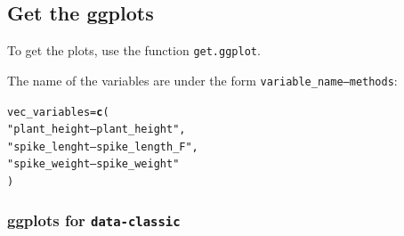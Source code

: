 \documentclass{article}\usepackage[]{graphicx}\usepackage[]{color}
\makeatletter
\newcommand{\hlstr}[1]{\textcolor[rgb]{0.192,0.494,0.8}{#1}}%
\newcommand{\hlstd}[1]{\textcolor[rgb]{0.345,0.345,0.345}{#1}}%
\newcommand{\hlkwb}[1]{\textcolor[rgb]{0.69,0.353,0.396}{#1}}%
\newcommand{\hlkwd}[1]{\textcolor[rgb]{0.737,0.353,0.396}{\textbf{#1}}}%
\newenvironment{kframe}{%
 \def\at@end@of@kframe{}%
 \ifinner\ifhmode%
  \def\at@end@of@kframe{\end{minipage}}%
  \begin{minipage}{\columnwidth}%
 \fi\fi%
 \def\FrameCommand##1{\hskip\@totalleftmargin \hskip-\fboxsep
 \colorbox{shadecolor}{##1}\hskip-\fboxsep
     \hskip-\linewidth \hskip-\@totalleftmargin \hskip\columnwidth}%
 \MakeFramed {\advance\hsize-\width
   \@totalleftmargin\z@ \linewidth\hsize
   \@setminipage}}%
 {\par\unskip\endMakeFramed%
 \at@end@of@kframe}
\newenvironment{knitrout}{}{} %
\makeatother
\begin{document}
\subsection{Get the ggplots}

To get the plots, use the function \texttt{get.ggplot}.

The name of the variables are under the form \texttt{variable\_name---methods}:
\begin{knitrout}
\color{fgcolor}\begin{kframe}
\begin{alltt}
\hlstd{vec_variables} \hlkwb{=} \hlkwd{c}\hlstd{(}
        \hlstr{"plant_height---plant_height"}\hlstd{,}
        \hlstr{"spike_lenght---spike_length_F"}\hlstd{,}
        \hlstr{"spike_weight---spike_weight"}
        \hlstd{)}
\end{alltt}
\end{kframe}
\end{knitrout}

\subsubsection{ggplots for \texttt{data-classic} }
\end{document}
